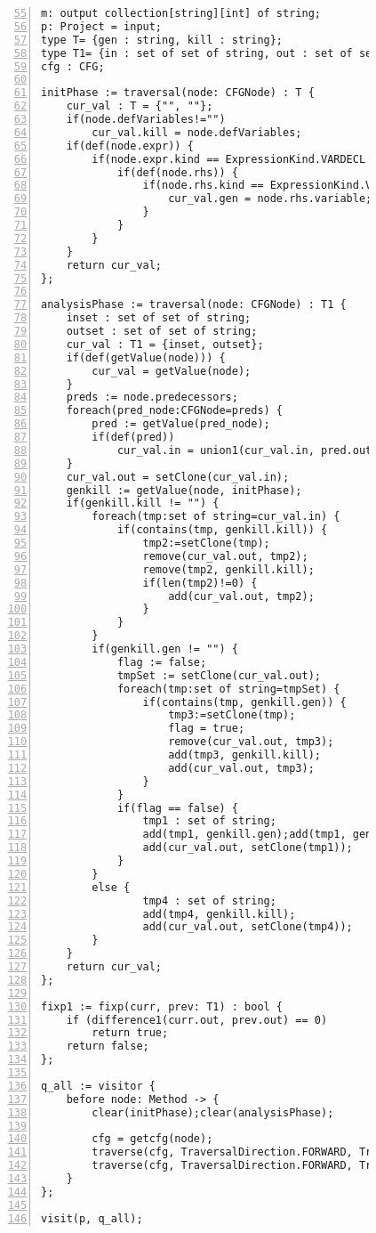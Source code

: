 \begin{figure}[ht!]
\begin{lstlisting}[numbers=left, tabsize=4, escapechar=@, caption={Local may alias},label={lst:lma-code}, firstline = 55, firstnumber = 55] 
m: output collection[string][int] of string;
p: Project = input;
type T= {gen : string, kill : string};
type T1= {in : set of set of string, out : set of set of string};
cfg : CFG;

initPhase := traversal(node: CFGNode) : T {
	cur_val : T = {"", ""};
	if(node.defVariables!="")
		cur_val.kill = node.defVariables;
	if(def(node.expr)) {
		if(node.expr.kind == ExpressionKind.VARDECL || node.expr.kind == ExpressionKind.ASSIGN) {
			if(def(node.rhs)) {
				if(node.rhs.kind == ExpressionKind.VARACCESS) {
					cur_val.gen = node.rhs.variable;
				}
			}
		}
	}
	return cur_val;
};

analysisPhase := traversal(node: CFGNode) : T1 {
	inset : set of set of string;
	outset : set of set of string;
	cur_val : T1 = {inset, outset};
	if(def(getValue(node))) {
		cur_val = getValue(node);
	}	
	preds := node.predecessors;
	foreach(pred_node:CFGNode=preds) {	
		pred := getValue(pred_node);
		if(def(pred))
			cur_val.in = union1(cur_val.in, pred.out);
	}
	cur_val.out = setClone(cur_val.in);
	genkill := getValue(node, initPhase);
	if(genkill.kill != "") {
		foreach(tmp:set of string=cur_val.in) {
			if(contains(tmp, genkill.kill)) {
				tmp2:=setClone(tmp);
				remove(cur_val.out, tmp2);
				remove(tmp2, genkill.kill);
				if(len(tmp2)!=0) {
					add(cur_val.out, tmp2);
				}
			}
		}
		if(genkill.gen != "") {
			flag := false;
			tmpSet := setClone(cur_val.out);
			foreach(tmp:set of string=tmpSet) {
				if(contains(tmp, genkill.gen)) {
					tmp3:=setClone(tmp);
					flag = true;
					remove(cur_val.out, tmp3);
					add(tmp3, genkill.kill);
					add(cur_val.out, tmp3);
				}
			}
			if(flag == false) {
				tmp1 : set of string;
				add(tmp1, genkill.gen);add(tmp1, genkill.kill);
				add(cur_val.out, setClone(tmp1));
			}
		}
		else {
				tmp4 : set of string;
				add(tmp4, genkill.kill);
				add(cur_val.out, setClone(tmp4));
		}
	}
	return cur_val;
};

fixp1 := fixp(curr, prev: T1) : bool {
	if (difference1(curr.out, prev.out) == 0)
		return true;	
	return false;
};

q_all := visitor {
	before node: Method -> {
		clear(initPhase);clear(analysisPhase);

		cfg = getcfg(node);
		traverse(cfg, TraversalDirection.FORWARD, TraversalKind.HYBRID, initPhase);
		traverse(cfg, TraversalDirection.FORWARD, TraversalKind.HYBRID, analysisPhase, fixp1);
	}
};

visit(p, q_all);
\end{lstlisting}
\end{figure}